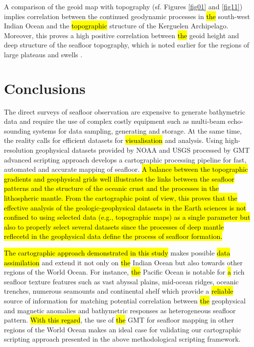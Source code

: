 \documentclass[geomatics,article,submit,pdftex,moreauthors]{Definitions/mdpi}
\begin{document}
A comparison of the geoid map with topography (sf. Figures \ref{fig01} and \ref{fig11}) implies correlation between the continued geodynamic processes in \hl{the }south-west Indian Ocean and the \hl{topographic} structure of the Kerguelen Archipelago. Moreover, this proves a high positive correlation between \hl{the }geoid height and deep structure of the seafloor topography, which is noted earlier for the regions of large plateaus and swells \cite{SandwellMacKenzie}. 

\section{Conclusions}

The direct surveys of seafloor observation are expensive to generate bathymetric data and require the use of complex costly equipment such as multi-beam echo-sounding systems for data sampling, generating and storage. At the same time, the reality calls for efficient datasets for \hl{visualisation} and analysis. Using high-resolution geophysical datasets provided by NOAA and USGS processed by GMT advanced scripting approach develops a cartographic processing pipeline for fast, automated and accurate mapping of seafloor. \hl{A balance between the topographic gradients and geophysical grids well illustrates the links between the seafloor patterns and the structure of the oceanic crust and the processes in the lithospheric mantle. From the cartographic point of view, this proves that the effective analysis of the geologic-geophysical datasets in the Earth sciences is not confined to using selected data (e.g., topographic maps) as a single parameter but also to properly select several datasets since the processes of deep mantle reflecetd in the geophysical data define the process of seafloor formation. }

\hl{The cartographic approach demonstrated in this study }makes possible \hl{data assimilation} and extend it not only on \hl{the }Indian Ocean but also towards other regions of the World Ocean. For instance, \hl{the }Pacific Ocean is notable for \hl{a }rich seafloor texture features such as vast abyssal plains, mid-ocean ridges, oceanic trenches, numerous seamounts and continental shelf which provide a \hl{reliable} source of information for matching potential correlation between \hl{the }geophysical and magnetic anomalies and bathymetric responses as heterogeneous seafloor pattern. \hl{With this regard}, the use of \hl{the }GMT\hl{ }for seafloor mapping in other regions of the World Ocean makes an ideal case for validating our cartographic scripting approach presented in the above methodological scripting framework. 
\end{document}
